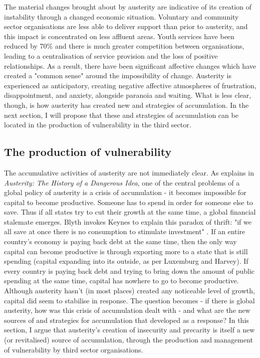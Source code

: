 The material changes brought about by austerity are indicative of its creation of instability through a changed economic situation. Voluntary and community sector organisations are less able to deliver support than prior to austerity, and this impact is concentrated on less affluent areas. Youth services have been reduced by 70\% and there is much greater competition between organisations, leading to a centralisation of service provision and the loss of positive relationships. As a result, there have been significant affective changes which have created a "common sense" around the impossibility of change. Austerity is experienced as anticipatory, creating negative affective atmospheres of frustration, disappointment, and anxiety, alongside paranoia and waiting. What is less clear, though, is how austerity has created new  and strategies of accumulation. In the next section, I will propose that these  and strategies of accumulation can be located in the production of vulnerability in the third sector.

\subsection{The production of vulnerability}
\label{subsec:the-production-of-vulnerability}

The accumulative activities of austerity are not immediately clear. As \citet{blyth_austerity_2013} explains in \emph{Austerity: The History of a Dangerous Idea}, one of the central problems of a global policy of austerity is a crisis of accumulation - it becomes impossible for capital to become productive. Someone has to spend in order for someone else to save. Thus if all states try to cut their growth at the same time,  a global financial stalemate emerges. Blyth invokes Keynes to explain this paradox of thrift: "if we all save at once there is no consumption to stimulate investment" \citep[8]{blyth_austerity_2013}. If an entire country's economy is paying back debt at the same time, then the only way capital can become productive is through exporting more to a state that is still spending (capital expanding into its outside, as per Luxemburg and Harvey). If every country is paying back debt and trying to bring down the amount of public spending at the same time, capital has nowhere to go to become productive. Although austerity hasn't (in most places) created any noticeable level of growth, capital did seem to stabilise in response. The question becomes - if there is global austerity, how was this crisis of accumulation dealt with - and what are the new sources of and strategies for accumulation that developed as a response? In this section, I argue that austerity's creation of insecurity and precarity is itself a new (or revitalised) source of accumulation, through the production and management of vulnerability by third sector organisations. 

